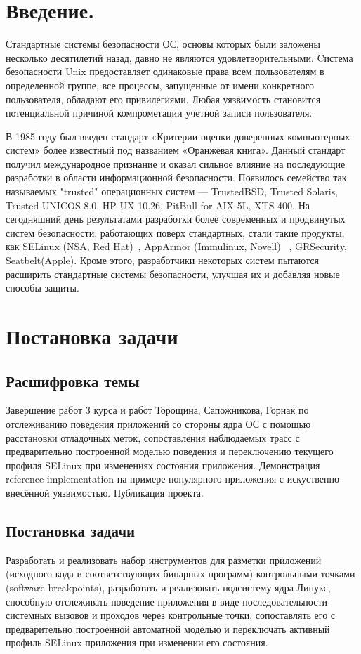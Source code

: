 \bigskip 
\section{Введение.}

Стандартные системы безопасности ОС, основы которых 
были заложены несколько десятилетий назад, давно не 
являются удовлетворительными. Cистема 
безопасности Unix предоставляет одинаковые права всем 
пользователям в определенной группе, все процессы, 
запущенные от имени конкретного пользователя, обладают 
его привилегиями. Любая уязвимость становится 
потенциальной причиной компрометации учетной записи 
пользователя. 

В 1985 году был введен стандарт «Критерии 
оценки доверенных компьютерных систем» более известный 
под названием «Оранжевая книга». Данный стандарт получил 
международное признание и оказал сильное влияние на 
последующие разработки в области информационной безопасности. 
Появилось семейство так называемых "trusted" операционных 
систем — TrustedBSD, Trusted Solaris, Trusted UNICOS 8.0, 
HP-UX 10.26, PitBull for AIX 5L, XTS-400. На сегодняшний 
день результатами разработки 
более современных и продвинутых систем безопасности, 
работающих поверх стандартных, стали такие продукты, как 
SELinux (NSA, Red Hat)~\cite{SEOF}, AppArmor (Immulinux, Novell) 
~\cite{AppArmor},
GRSecurity\cite{pax}, Seatbelt(Apple). Кроме этого, разработчики 
некоторых систем пытаются расширить стандартные системы 
безопасности, улучшая их и добавляя новые способы защиты.

\section{Постановка задачи}
\subsection{Расшифровка темы}
Завершение работ 3 курса и работ Торощина,
Сапожникова, Горнак по отслеживанию поведения приложений со стороны ядра
ОС с помощью расстановки отладочных меток, сопоставления наблюдаемых
трасс с предварительно построенной моделью поведения и переключению
текущего профиля SELinux при изменениях состояния приложения.
Демонстрация reference implementation на примере популярного приложения
с искуственно внесённой уязвимостью. Публикация проекта.

\subsection{Постановка задачи} Разработать и реализовать набор инструментов для
разметки приложений (исходного кода и соответствующих бинарных программ)
контрольными точками (software breakpoints), разработать и реализовать
подсистему ядра Линукс, способную отслеживать поведение приложения в
виде последовательности системных вызовов и проходов через контрольные
точки, сопоставлять его с предварительно построенной автоматной моделью
и переключать активный профиль SELinux приложения при изменении его
состояния.


